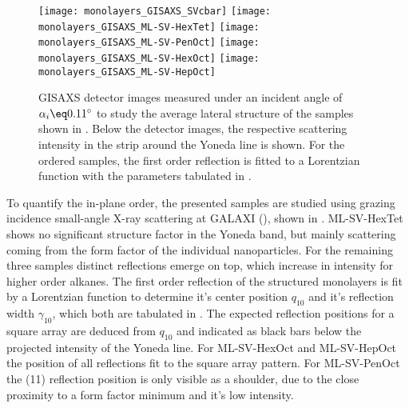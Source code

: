\documentclass[\main/dresen_thesis.tex]{subfiles}
\begin{document}
    \begin{figure}[tb]
      \centering
      \texttt{[image: monolayers\_GISAXS\_SVcbar]}
      \texttt{[image: monolayers\_GISAXS\_ML-SV-HexTet]}
      \texttt{[image: monolayers\_GISAXS\_ML-SV-PenOct]}
      \texttt{[image: monolayers\_GISAXS\_ML-SV-HexOct]}
      \texttt{[image: monolayers\_GISAXS\_ML-SV-HepOct]}
      \caption{\label{fig:monolayers:preparation:solventVariation:gisaxs}GISAXS detector images measured under an incident angle of $\alpha_i \eq 0.11 ^\circ$ to study the average lateral structure of the samples shown in . Below the detector images, the respective scattering intensity in the strip around the Yoneda line is shown. For the ordered samples, the first order reflection is fitted to a Lorentzian function with the parameters tabulated in .}
    \end{figure}

    To quantify the in-plane order, the presented samples are studied using grazing incidence small-angle X-ray scattering at GALAXI (), shown in .
    ML-SV-HexTet shows no significant structure factor in the Yoneda band, but mainly scattering coming from the form factor of the individual nanoparticles.
    For the remaining three samples distinct reflections emerge on top, which increase in intensity for higher order alkanes.
    The first order reflection of the structured monolayers is fit by a Lorentzian function to determine it's center position  $q_{10}$ and it's reflection width $\gamma_{10}$, which both are tabulated in .
    The expected reflection positions for a square array are deduced from $q_{10}$ and indicated as black bars below the projected intensity of the Yoneda line.
    For ML-SV-HexOct and ML-SV-HepOct the position of all reflections fit to the square array pattern.
    For ML-SV-PenOct the (11) reflection position is only visible as a shoulder, due to the close proximity to a form factor minimum and it's low intensity.
\end{document}
